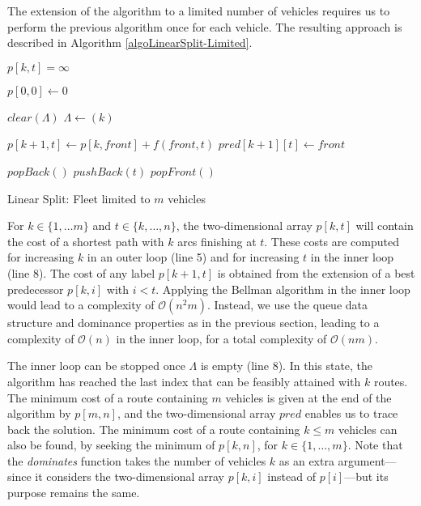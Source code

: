 \documentclass[11pt]{article}
\newcommand{\cO}{{\mathcal O}}
\begin{document}
The extension of the algorithm to a limited number of vehicles requires us to perform the previous algorithm once for each vehicle. The resulting approach is described in Algorithm \ref{algoLinearSplit-Limited}.

\begin{algorithm}[htbp]

{
{
$p[k,t] = \infty$ \;
}
}

$p[0,0] \gets 0$ \;
{ 
	$clear(\Lambda)$ \;
	$\Lambda \gets (k)$ \;
	{ 
  		$p[k+1,t] \gets p[k,front] + f(front,t)$ \;   \label{linearSplitPropagate-Limited}
  		$pred[k+1][t] \gets front $ \;

		{
			{
	  			{ $popBack()$ \; }
				$pushBack(t)$
			}
  			{ $popFront()$ \; }
		}
	}
}
 \caption{Linear Split: Fleet limited to $m$ vehicles} 
\label{algoLinearSplit-Limited} 
\end{algorithm}

For $k \in \{1,\dots m\}$ and $t \in \{k,\dots,n\}$, the two-dimensional array $p[k,t]$ will contain the cost of a shortest path with $k$ arcs finishing at $t$. These costs are computed for increasing $k$ in an outer loop (line 5) and for increasing $t$ in the inner loop (line 8). The cost of any label $p[k+1,t]$ is obtained from the extension of a best predecessor $p[k,i]$ with $i < t$. Applying the Bellman algorithm in the inner loop would lead to a complexity of $\cO(n^2 m)$. Instead, we use the queue data structure and dominance properties as in the previous section, leading to a complexity of $\cO(n)$ in the inner loop, for a total complexity of $\cO(nm)$.

The inner loop can be stopped once $\Lambda$ is empty (line 8). In this state, the algorithm has reached the last index that can be feasibly attained with $k$ routes.
The minimum cost of a route containing $m$ vehicles is given at the end of the algorithm by $p[m,n]$, and the two-dimensional array $pred$ enables us to trace back the solution. 
The minimum cost of a route containing $k \leq m$ vehicles can also be found, by seeking the minimum of $p[k,n]$, for $k \in \{1,\dots,m\}$.
Note that the \emph{dominates} function takes the number of vehicles $k$ as an extra argument---since it considers the two-dimensional array $p[k,i]$ instead of $p[i]$---but its purpose remains the same.
\end{document}
